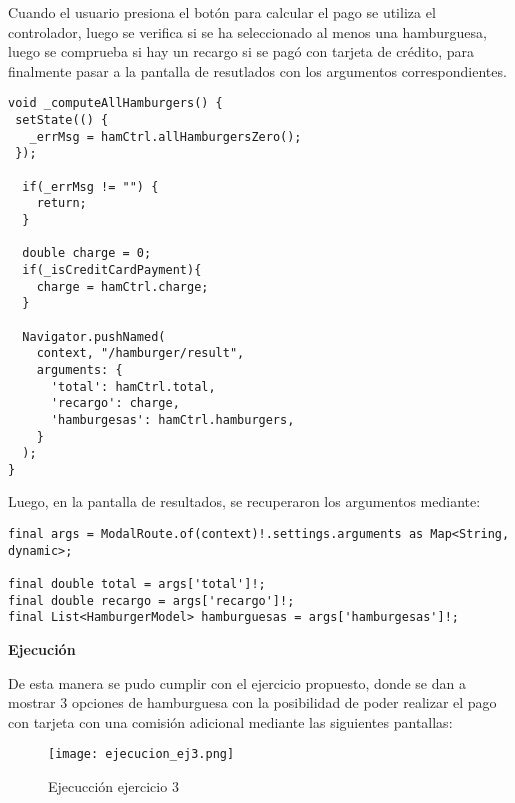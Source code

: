 Cuando el usuario presiona el botón para calcular el pago se utiliza el controlador, luego se verifica si se ha seleccionado al menos una hamburguesa, luego se comprueba si hay un recargo si se pagó con tarjeta de crédito, para finalmente pasar a la pantalla de resutlados con los argumentos correspondientes.

\begin{center}
\begin{lstlisting}
void _computeAllHamburgers() {
 setState(() {
   _errMsg = hamCtrl.allHamburgersZero();
 });

  if(_errMsg != "") {
    return;
  }

  double charge = 0;
  if(_isCreditCardPayment){
    charge = hamCtrl.charge;
  }

  Navigator.pushNamed(
    context, "/hamburger/result",
    arguments: {
      'total': hamCtrl.total,
      'recargo': charge,
      'hamburgesas': hamCtrl.hamburgers,
    }
  );
}
\end{lstlisting}
\end{center}

Luego, en la pantalla de resultados, se recuperaron los argumentos mediante:

\begin{center}
\begin{lstlisting}
final args = ModalRoute.of(context)!.settings.arguments as Map<String, dynamic>;

final double total = args['total']!;
final double recargo = args['recargo']!;
final List<HamburgerModel> hamburguesas = args['hamburgesas']!;
\end{lstlisting}
\end{center}

\textbf{Ejecución}

De esta manera se pudo cumplir con el ejercicio propuesto, donde se dan a mostrar 3 opciones de hamburguesa con la posibilidad de poder realizar el pago con tarjeta con una comisión adicional mediante las siguientes pantallas:

\begin{figure}[H]
    \centering
    \texttt{[image: ejecucion\_ej3.png]}
    \caption{Ejecucción ejercicio 3}
    \label{fig:ej3_ejecuccion}
\end{figure}